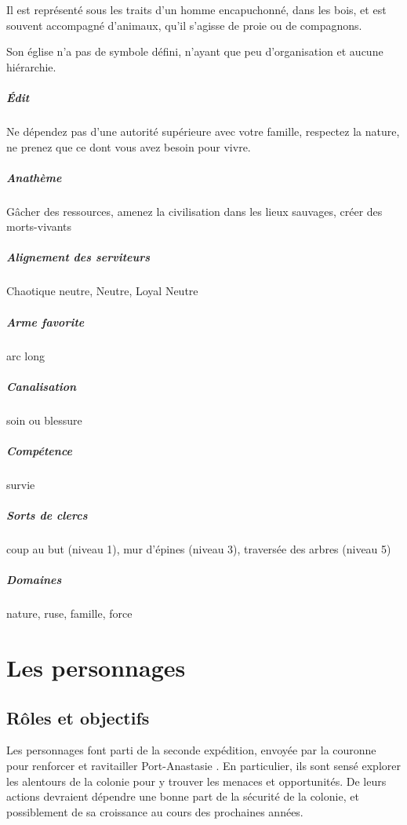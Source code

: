\documentclass[10pt,a4paper]{book}
\newcommand{\nomcolonie}{Port-Anastasie }
\begin{document}
Il est représenté sous les traits d'un homme encapuchonné, dans les bois, et est souvent accompagné d'animaux, qu'il s'agisse de proie ou de compagnons.

Son église n'a pas de symbole défini, n'ayant que peu d'organisation et aucune hiérarchie.
\paragraph{Édit} Ne dépendez pas d'une autorité supérieure avec votre famille, respectez la nature, ne prenez que ce dont vous avez besoin pour vivre.
\paragraph{Anathème} Gâcher des ressources, amenez la civilisation dans les lieux sauvages, créer des morts-vivants
\paragraph{Alignement des serviteurs} Chaotique neutre, Neutre, Loyal Neutre
\paragraph{Arme favorite }arc long
\paragraph{Canalisation} soin ou blessure
\paragraph{Compétence}survie
\paragraph{Sorts de clercs}coup au but (niveau 1), mur d'épines (niveau 3), traversée des arbres (niveau 5)
\paragraph{Domaines } nature, ruse, famille, force
\chapter{Les personnages}
\section{Rôles et objectifs}
Les personnages font parti de la seconde expédition, envoyée par la couronne pour renforcer et ravitailler \nomcolonie. En particulier, ils sont sensé explorer les alentours de la colonie pour y trouver les menaces et opportunités. De leurs actions devraient dépendre une bonne part de la sécurité de la colonie, et possiblement de sa croissance au cours des prochaines années.
\end{document}
